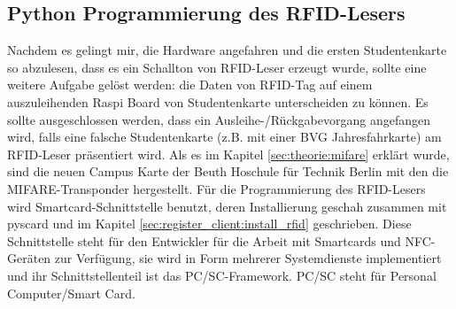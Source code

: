 \subsection{Python Programmierung des RFID-Lesers}
\label{sec:register_client:smart}
Nachdem es gelingt mir, die Hardware angefahren und die ersten Studentenkarte so abzulesen, dass es ein Schallton von RFID-Leser erzeugt wurde, sollte eine weitere Aufgabe gelöst werden: die Daten von RFID-Tag auf einem auszuleihenden Raspi Board von Studentenkarte unterscheiden zu können. Es sollte ausgeschlossen werden, dass ein Ausleihe-/Rückgabevorgang angefangen wird, falls eine falsche Studentenkarte (z.B. mit einer BVG Jahresfahrkarte) am RFID-Leser präsentiert wird. Als es im Kapitel \ref{sec:theorie:mifare} erklärt wurde, sind die neuen Campus Karte der Beuth Hoschule für Technik Berlin mit den die MIFARE-Transponder hergestellt. Für die Programmierung des RFID-Lesers wird Smartcard-Schnittstelle benutzt, deren Installierung geschah zusammen mit pyscard und im Kapitel \ref{sec:register_client:install_rfid} geschrieben. Diese Schnittstelle steht für den Entwickler für die Arbeit mit Smartcards und NFC-Geräten zur Verfügung, sie wird in Form mehrerer Systemdienste implementiert und ihr Schnittstellenteil ist das PC/SC-Framework. PC/SC steht für Personal Computer/Smart Card.


